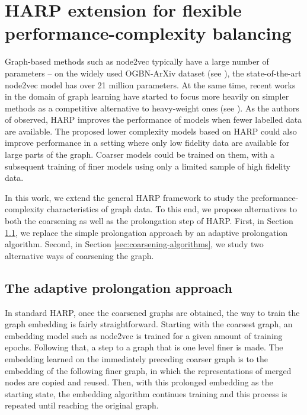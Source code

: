 \section{HARP extension for flexible performance-complexity balancing}

Graph-based methods such as node2vec typically have a large number of parameters -- on the widely used OGBN-ArXiv dataset (see \cite{hu_open_2021}), the state-of-the-art node2vec model has over 21 million parameters. At the same time, recent works in the domain of graph learning have started to focus more heavily on simpler methods as a competitive alternative to heavy-weight ones (see \cite{frasca_sign_2020,huang_combining_2020,salha_keep_2019,zhang_eigen-gnn_2021}). As the authors of \cite{chen_harp_2018} observed, HARP improves the performance of models when fewer labelled data are available. The proposed lower complexity models based on HARP could also improve performance in a setting where only low fidelity data are available for large parts of the graph. Coarser models could be trained on them, with a subsequent training of finer models using only a limited sample of high fidelity data.

In this work, we extend the general HARP framework to study the preformance-complexity characteristics of graph data. To this end, we propose alternatives to both the coarsening as well as the prolongation step of HARP. First, in Section \ref{sec:adaptive-prolongation}, we replace the simple prolongation approach by an adaptive prolongation algorithm. Second, in Section \ref{sec:coarsening-algorithms}, we study two alternative ways of coarsening the graph.

\subsection{The adaptive prolongation approach}\label{sec:adaptive-prolongation}

In standard HARP, once the coarsened graphs are obtained, the way to train the graph embedding is fairly straightforward. Starting with the coarsest graph, an embedding model such as node2vec is trained for a given amount of training epochs. Following that, a step to a graph that is one level finer is made. The embedding learned on the immediately preceding coarser graph is  to the embedding of the following finer graph, in which the representations of merged nodes are copied and reused. Then, with this prolonged embedding as the starting state, the embedding algorithm continues training and this process is repeated until reaching the original graph.


